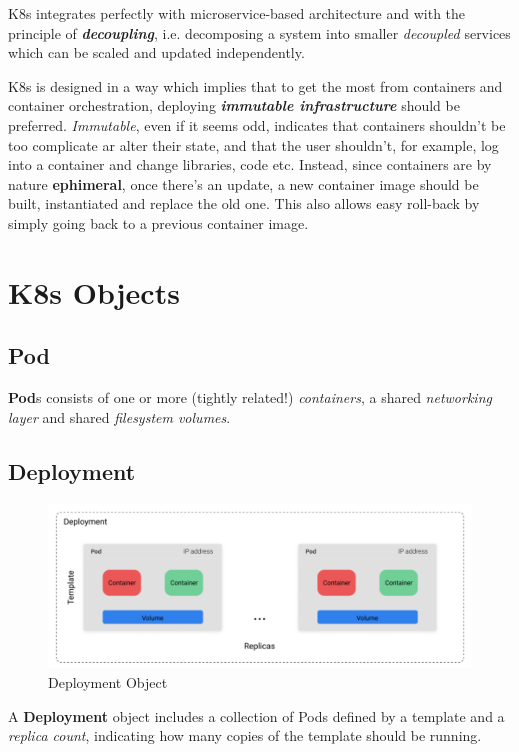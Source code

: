 K8s integrates perfectly with microservice-based architecture and with the principle of \textit{\textbf{decoupling}},
i.e. decomposing a system into smaller \textit{decoupled} services which can be scaled and updated independently.

K8s is designed in a way which implies that to get the most from containers and container orchestration,
deploying \textit{\textbf{immutable infrastructure}} should be preferred.
\textit{Immutable}, even if it seems odd, indicates that containers shouldn't be too complicate ar alter their state,
and that the user shouldn't, for example, log into a container and change libraries, code etc.
Instead, since containers are by nature \textbf{ephimeral},
once there's an update,
a new container image should be built, instantiated and replace the old one.
This also allows easy roll-back by simply going back to a previous container image.

\section{K8s Objects}
\subsection{Pod}
\textbf{Pod}s consists of one or more (tightly related!) \textit{containers}, a shared \textit{networking layer} and shared \textit{filesystem volumes}.

\subsection{Deployment}
\begin{figure}[htbp]
   \centering
   \includegraphics{images/K8s_deployment.png}
   \caption{Deployment Object}
   \label{fig:K8s_deployment}
\end{figure}

A \textbf{Deployment} object includes a collection of Pods defined by a template and a \textit{replica count},
indicating how many copies of the template should be running.

